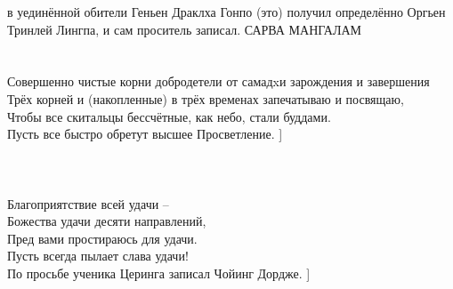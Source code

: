 в уединённой обители Геньен Драклха Гонпо (это) получил определённо
Оргьен Тринлей Лингпа, и сам проситель записал. САРВА МАНГАЛАМ\\
\normalsize
\newpage
{}
\Vspace{1cm}
\SubSubSectionNo{[ Из “Объединённой практики Трёх корней Гуру”}\\
\\
Совершенно чистые корни добродетели от самадxи зарождения и завершения\\
Трёх корней и (накопленные) в трёх временах запечатываю и посвящаю,\\
Чтобы все скитальцы бессчётные, как небо, стали буддами.\\
Пусть все быстро обретут высшее Просветление. ]\\
\\
\SubSubSectionNo{[ Острие удачи}\\
\\
Благоприятствие всей удачи – \\
Божества удачи десяти направлений,\\
Пред вами простираюсь для удачи.\\
Пусть всегда пылает слава удачи!\\
\scriptsize
По просьбе ученика Церинга записал Чойинг Дордже.
\normalsize
 ]\\
\\
